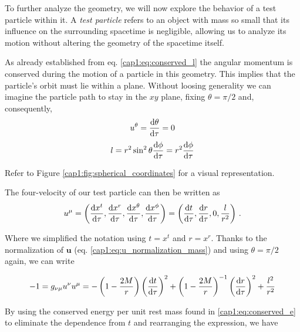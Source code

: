 \begin{minipage}{0.57 \textwidth}
    To further analyze the \Sh geometry, we will now explore the behavior of a
    test particle within it.
    A \textit{test particle} refers to an object with mass so small that its
    influence on the surrounding spacetime is negligible, allowing us to
    analyze its motion without altering the geometry of the spacetime itself.

    As already established from eq. \ref{cap1:eq:conserved_l} the angular
    momentum is conserved during the motion of a particle in this geometry.
    This implies that the particle's orbit must lie within a plane.
    Without loosing generality we can imagine the particle path to stay in the
    $xy$ plane, fixing $\theta = \pi / 2$ and, consequently,
    \begin{equation*}
        u^\theta = \dv{\theta}{\tau} = 0 
    \end{equation*}
    \begin{equation*}
        l = r^2 \sin^2 \theta \dv{\phi}{\tau} = r^2 \dv{\phi}{\tau}
    \end{equation*}

    Refer to Figure \ref{cap1:fig:spherical_coordinates} for a visual
    representation.
\end{minipage}
\hspace{0.02 \textwidth}

The four-velocity of our test particle can then be written as
\begin{equation*}
    u^\mu
    = \left(\dv{x^t}{\tau}, \dv{x^r}{\tau}, \dv{x^\theta}{\tau},
    \dv{x^\phi}{\tau} \right)
    = \left(\dv{t}{\tau}, \dv{r}{\tau}, 0, \frac{l}{r^2} \right) \, .
\end{equation*}

Where we simplified the notation using $t = x^t$ and $r = x^r$.
Thanks to the normalization of $\mathbf u$ (eq.
\ref{cap1:eq:u_normalization_mass}) and using $\theta = \pi / 2$ again, we can
write

\begin{equation*}
    - 1 = g_{\nu \mu} u^\nu u^\mu =
    - \left(1 - \frac{2M}{r} \right) \left(\dv{t}{\tau} \right)^2
    + \left(1 - \frac{2M}{r} \right)^{- 1} \left(\dv{r}{\tau} \right)^2
    + \frac{l^2}{r^2}
\end{equation*}

By using the conserved energy per unit rest mass found in
\ref{cap1:eq:conserved_e} to eliminate the dependence from $t$ and rearranging
the expression, we have

